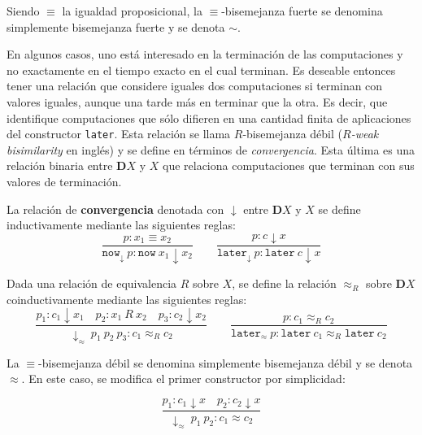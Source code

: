 Siendo $\equiv$ la igualdad proposicional, la $\equiv$-bisemejanza fuerte se denomina simplemente bisemejanza fuerte y se denota $\sim$.

En algunos casos, uno está interesado en la terminación de las computaciones y no exactamente en el tiempo exacto en el cual terminan. Es deseable entonces tener una relación que considere iguales dos computaciones si terminan con valores iguales, aunque una tarde más en terminar que la otra. Es decir, que identifique computaciones que sólo difieren en una cantidad finita de aplicaciones del constructor \texttt{later}. Esta relación se llama $R$-bisemejanza débil (\textit{$R$-weak bisimilarity} en inglés) y se define en términos de \textit{convergencia}. Esta última es una relación binaria entre $\mathbf{D}X$ y $X$ que relaciona computaciones que terminan con sus valores de terminación. 

\begin{definition}[Convergencia]\label{def:convergencia}
La relación de \textbf{convergencia} denotada con $\downarrow$ entre $\mathbf{D}X$ y $X$ se define inductivamente mediante las siguientes reglas:
\begin{equation*}
\dfrac{p : x_1 \equiv x_2}{\mathtt{now}_{\downarrow}  \ p : \mathtt{now} \ x_1 \downarrow x_2}  	\qquad  	\dfrac{p : c \downarrow x}{\mathtt{later}_{\downarrow} \ p : \mathtt{later} \ c \downarrow x}
\end{equation*}
\end{definition}

\begin{definition}
Dada una relación de equivalencia $R$ sobre $X$, se define la relación $\approx_R$ sobre $\mathbf{D}X$ coinductivamente mediante las siguientes reglas:
\begin{equation*}
\dfrac{p_1 : c_1 \downarrow x_1 \quad p_2 : x_1 \ R \ x_2 \quad p_3 : c_2 \downarrow x_2}{\downarrow_{\approx} \ p_1 \ p_2 \ p_3 : c_1 \approx_R c_2}  	\qquad  	\dfrac{p : c_1 \approx_R c_2}{\mathtt{later}_{\approx} \ p : \mathtt{later} \ c_1 \approx_R \mathtt{later} \ c_2}
\end{equation*}
\end{definition}

La $\equiv$-bisemejanza débil se denomina simplemente bisemejanza débil y se denota $\approx$. En este caso, se modifica el primer constructor por simplicidad:

\begin{equation*}
\dfrac{p_1 : c_1 \downarrow x \quad p_2 : c_2 \downarrow x}{\downarrow_{\approx} \ p_1 \ p_2 : c_1 \approx c_2}
\end{equation*}

